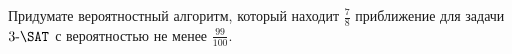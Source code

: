 Придумате вероятностный алгоритм, который находит $\frac{7}{8}$ приближение для задачи $3\text{-}\SAT$ с вероятностью не
менее $\frac{99}{100}$.